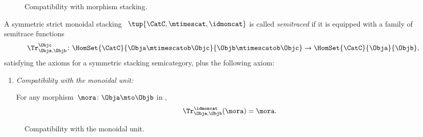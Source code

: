     
    \begin{figure}[h!]
    \centering
    \caption{Compatibility with morphism stacking.}
    \label{fig:axiomatic-semicat-semitrace-superposing}
\end{figure}
    
    \begin{ctdefinition}
        \label{def:semitraced-strict-mon-scat}
       A symmetric strict monoidal stacking ~$\tup{\CatC, \mtimescat, \idmoncat }$ is called \emph{semitraced} if it is equipped with a family of semitrace functions
        \begin{equation}
            \Tr_{\Obja,\Objb}^\Objc\colon \HomSet{\CatC}{\Obja \mtimescatob \Objc}{\Objb\mtimescatob \Objc}\to \HomSet{\CatC}{\Obja}{\Objb},
        \end{equation}
        satisfying the axioms for a symmetric stacking semicategory, plus the following axiom:
        \begin{enumerate}

            \item \emph{Compatibility with the monoidal unit:}
            
                  For any morphism~$\mora \colon \Obja\mto \Objb$ in \CatC,
                  \begin{equation}
                      \label{eq:semicat-semitrace-vanishing_1}
                      \Tr_{\Obja,\Objb}^\idmoncat (\mora)=\mora.
                  \end{equation}

        \end{enumerate}
    \end{ctdefinition}

\begin{figure}[h!]
    \centering
    \caption{Compatibility with the monoidal unit.}
    \label{fig:axiomatic-semicat-semitrace-vanishing-I}
\end{figure}


